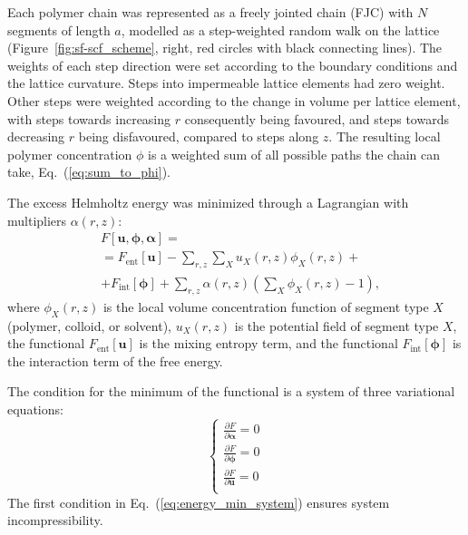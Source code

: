 \documentclass[10pt, a4paper]{article}
\begin{document}
\begin{multicols}{2}
Each polymer chain was represented as a freely jointed chain (FJC) with $N$ segments of length $a$, modelled as a step-weighted random walk on the lattice (Figure~\ref{fig:sf-scf_scheme}, right, red circles with black connecting lines).
The weights of each step direction were set according to the boundary conditions and the lattice curvature.
Steps into impermeable lattice elements had zero weight.
Other steps were weighted according to the change in volume per lattice element, with steps towards increasing $r$ consequently being favoured, and steps towards decreasing $r$ being disfavoured, compared to steps along $z$.
The resulting local polymer concentration $\phi$ is a weighted sum of all possible paths the chain can take, Eq.~(\ref{eq:sum_to_phi}).

The excess Helmholtz energy was minimized through a Lagrangian with multipliers $\alpha(r,z)$:
\begin{equation}
    \label{eq:fe_lagrangian}
    \begin{aligned}
        &F[\bm{u}, \boldsymbol{\phi}, \boldsymbol{\alpha}] =\\
        &= F_{\text{ent}}[\bm{u}] - \sum\limits_{r,z} \sum\limits_X u_X(r, z) \phi_X(r, z) + \\
        &+ F_{\text{int}} [\boldsymbol{\phi}] 
        + \sum\limits_{r,z} \alpha(r, z) \left( \sum\limits_X \phi_X(r, z) - 1 \right),
    \end{aligned} 
\end{equation}
where $\phi_X(r,z)$ is the local volume concentration function of segment type $X$ (polymer, colloid, or solvent), $u_X(r, z)$ is the potential field of segment type $X$, the functional $F_{\text{ent}}[\bm{u}]$ is the mixing entropy term, and the functional $F_{\text{int}} [\boldsymbol{\phi}]$ is the interaction term of the free energy.

The condition for the minimum of the functional is a system of three variational equations:
\begin{equation}
    \label{eq:energy_min_system}
    \begin{cases}
        \frac{\partial F}{\partial \boldsymbol{\alpha}} = 0 \\
        \frac{\partial F}{\partial \boldsymbol{\phi}} = 0 \\
        \frac{\partial F}{\partial \bm{u}} = 0 \\
    \end{cases}
\end{equation}
The first condition in Eq.~(\ref{eq:energy_min_system}) ensures system incompressibility.


\end{multicols}
\end{document}
